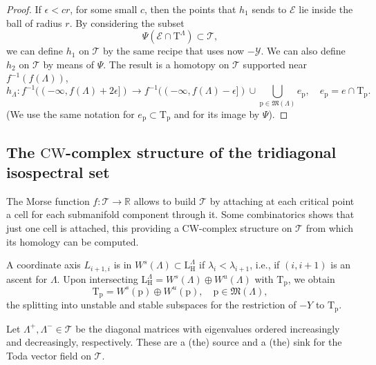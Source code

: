 \documentclass[reqno]{amsart}
\newcommand{\p}{\mathrm{p}}
\newcommand{\cT}{\mathcal{T}}
\newcommand{\cY}{\mathcal{Y}}
\newcommand{\R}{\mathbb{R}}
\newcommand{\T}{\mathbb{T}}
\renewcommand{\L}{\mathrm{L}}
\renewcommand{\T}{\mathrm{T}}
\renewcommand{\H}{\mathrm{H}}
\begin{document}
\begin{proof}
If  $\epsilon <cr$, for some small $c$, then the points that $h_1$ sends to $\mathcal{E}$ lie inside the ball of radius $r$. By considering the subset
\[\Psi(\mathcal{E}\cap \T^\Lambda)\subset \cT,\] we can define $h_1$ on $\cT$ by the same recipe that uses now $-\cY$. We can also  define $h_2$ on $\cT$ by means of $\Psi$. The result is a  homotopy on $\cT$ supported near $f^{-1}(f(\Lambda))$,
\[
  h_\Lambda:f^{-1}((-\infty, f(\Lambda)+2\epsilon])\to f^{-1}((-\infty, f(\Lambda)-\epsilon])\cup \bigcup_{\p\in \mathfrak{M}(\Lambda)}e_{\p},\quad e_{\p}=e\cap \T_{\p}.
\]
(We use the same notation for  $e_{\p}\subset \T_{\p}$ and for its image by $\Psi$).
\end{proof}
\subsection{The $\mathrm{CW}$-complex structure of the tridiagonal isospectral set}\label{ssec:homology}
The Morse function $f:\cT\to\R$ allows to build $\cT$ by attaching at each critical point a cell for each submanifold component through it. Some combinatorics shows that just one cell is attached, this providing a CW-complex structure on $\cT$ from which its homology can be computed.

A coordinate axis $L_{i+1,i}$ is in $W^s(\Lambda)\subset \L^\Lambda_\H$ if $\lambda_{i}<\lambda_{i+1}$, i.e., if $(i,i+1)$ is an ascent for $\Lambda$. Upon intersecting $\L^\Lambda_\H=W^s(\Lambda)\oplus W^u(\Lambda)$ with $\T_{\p}$, we obtain
\[\T_{\p}=W^s(\p)\oplus W^u(\p),\quad \p\in \mathfrak{M}(\Lambda),\]
the splitting into unstable and stable subspaces for the restriction of $-Y$ to $\T_{\p}$.

Let $\Lambda^+,\Lambda^-\in \cT$ be the diagonal matrices with eigenvalues  ordered increasingly and decreasingly, respectively. These are  a (the) source and a (the) sink for the Toda vector field on $\cT$.
\end{document}

